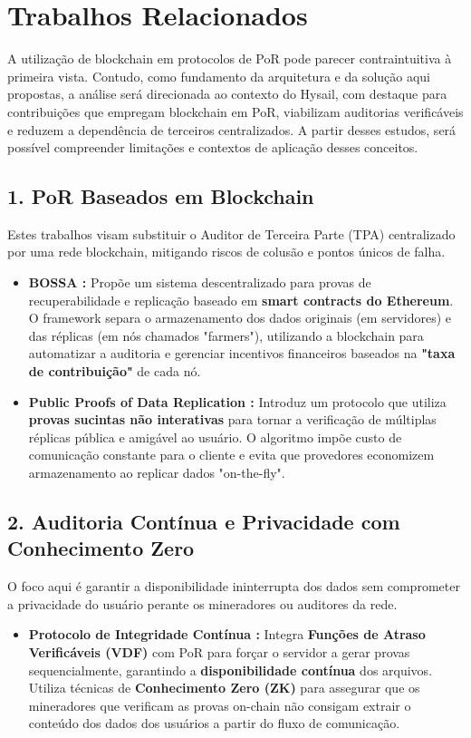 \section{Trabalhos Relacionados}%

A utilização de blockchain em protocolos de PoR pode parecer contraintuitiva à primeira vista. Contudo, como fundamento da arquitetura e da solução aqui propostas, a análise será direcionada ao contexto do Hysail, com destaque para contribuições que empregam blockchain em PoR, viabilizam auditorias verificáveis e reduzem a dependência de terceiros centralizados. A partir desses estudos, será possível compreender limitações e contextos de aplicação desses conceitos.

\subsection*{1. PoR Baseados em Blockchain}
Estes trabalhos visam substituir o Auditor de Terceira Parte (TPA) centralizado por uma rede blockchain, mitigando riscos de colusão e pontos únicos de falha.
\begin{itemize}
    \item \textbf{BOSSA \cite{chen2021bossa}:} Propõe um sistema descentralizado para provas de recuperabilidade e replicação baseado em \textbf{smart contracts do Ethereum}.
O framework separa o armazenamento dos dados originais (em servidores) e das réplicas (em nós chamados "farmers"), utilizando a blockchain para automatizar a auditoria e gerenciar incentivos financeiros baseados na \textbf{"taxa de contribuição"} de cada nó.
    \item \textbf{Public Proofs of Data Replication \cite{shen2024public}:} Introduz um protocolo que utiliza \textbf{provas sucintas não interativas} para tornar a verificação de múltiplas réplicas pública e amigável ao usuário.
O algoritmo impõe custo de comunicação constante para o cliente e evita que provedores economizem armazenamento ao replicar dados "on-the-fly".
\end{itemize}

\subsection*{2. Auditoria Contínua e Privacidade com Conhecimento Zero}
O foco aqui é garantir a disponibilidade ininterrupta dos dados sem comprometer a privacidade do usuário perante os mineradores ou auditores da rede.
\begin{itemize}
    \item \textbf{Protocolo de Integridade Contínua \cite{huang2022blockchain}:} Integra \textbf{Funções de Atraso Verificáveis (VDF)} com PoR para forçar o servidor a gerar provas sequencialmente, garantindo a \textbf{disponibilidade contínua} dos arquivos.
    Utiliza técnicas de \textbf{Conhecimento Zero (ZK)} para assegurar que os mineradores que verificam as provas on-chain não consigam extrair o conteúdo dos dados dos usuários a partir do fluxo de comunicação.
\end{itemize}


